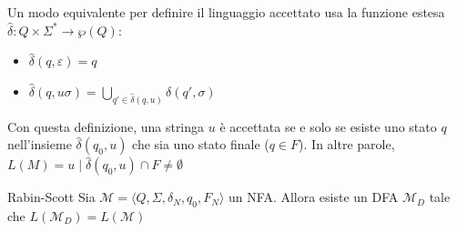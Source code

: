 \documentclass[12pt, a4paper]{report}
\begin{document}
\begin{itemize}
                    Un modo equivalente per definire il linguaggio accettato usa la funzione estesa $\hat{\delta} : Q \times \Sigma^* \to \wp(Q)$: \begin{itemize}
                        \item $\hat{\delta}(q, \varepsilon) = {q}$
                        \item $\hat{\delta}(q, u\sigma) = \bigcup_{q' \in \hat{\delta}(q, u)} \delta(q', \sigma)$
                    \end{itemize}
                    Con questa definizione, una stringa $u$ è accettata se e solo se esiste uno stato $q$ nell'insieme $\hat{\delta}(q_0, u)$ che sia uno stato finale ($q \in F$). In altre parole, $L(M) = {u \mid \hat{\delta}(q_0, u) \cap F \neq \emptyset }$
                \end{itemize}
                \begin{theorembox}{Rabin-Scott}{}
                    Sia $\mathcal{M}=\langle Q,\Sigma,\delta_N,q_0,F_N\rangle$ un NFA. Allora esiste un DFA $\mathcal{M}_D$ tale che $L(\mathcal{M}_D)=L(\mathcal{M})$
                \end{theorembox}
\end{document}
